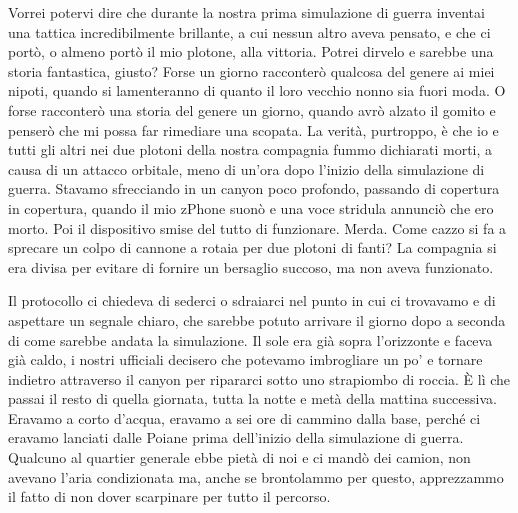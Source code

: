 Vorrei potervi dire che durante la nostra prima simulazione di guerra
inventai una tattica incredibilmente brillante, a cui nessun altro aveva
pensato, e che ci portò, o almeno portò il mio plotone, alla vittoria.
Potrei dirvelo e sarebbe una storia fantastica, giusto? Forse un giorno
racconterò qualcosa del genere ai miei nipoti, quando si lamenteranno di
quanto il loro vecchio nonno sia fuori moda. O forse racconterò una
storia del genere un giorno, quando avrò alzato il gomito e penserò che
mi possa far rimediare una scopata. La verità, purtroppo, è che io e
tutti gli altri nei due plotoni della nostra compagnia fummo dichiarati
morti, a causa di un attacco orbitale, meno di un'ora dopo l'inizio
della simulazione di guerra. Stavamo sfrecciando in un canyon poco
profondo, passando di copertura in copertura, quando il mio zPhone suonò
e una voce stridula annunciò che ero morto. Poi il dispositivo smise del
tutto di funzionare. Merda. Come cazzo si fa a sprecare un colpo di
cannone a rotaia per due plotoni di fanti? La compagnia si era divisa
per evitare di fornire un bersaglio succoso, ma non aveva funzionato.

Il protocollo ci chiedeva di sederci o sdraiarci nel punto in cui ci
trovavamo e di aspettare un segnale chiaro, che sarebbe potuto arrivare
il giorno dopo a seconda di come sarebbe andata la simulazione. Il sole
era già sopra l'orizzonte e faceva già caldo, i nostri ufficiali
decisero che potevamo imbrogliare un po' e tornare indietro attraverso
il canyon per ripararci sotto uno strapiombo di roccia. È lì che passai
il resto di quella giornata, tutta la notte e metà della mattina
successiva. Eravamo a corto d'acqua, eravamo a sei ore di cammino dalla
base, perché ci eravamo lanciati dalle Poiane prima dell'inizio della
simulazione di guerra. Qualcuno al quartier generale ebbe pietà di noi e
ci mandò dei camion, non avevano l'aria condizionata ma, anche se
brontolammo per questo, apprezzammo il fatto di non dover scarpinare per
tutto il percorso.

\hfill\break

